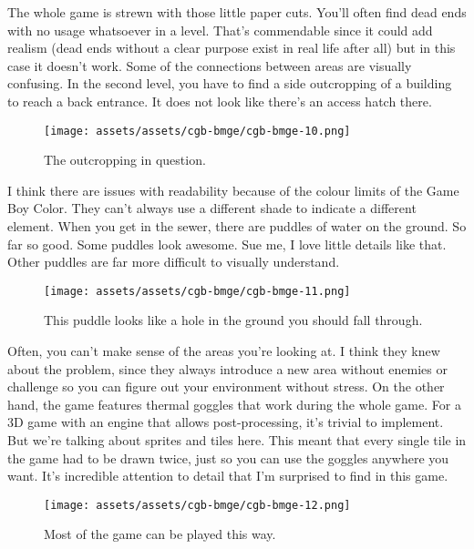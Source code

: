 \documentclass{book}
\begin{document}
The whole game is strewn with those little paper cuts. You’ll often find dead ends with no usage whatsoever in a level. That’s commendable since it could add realism (dead ends without a clear purpose exist in real life after all) but in this case it doesn’t work. Some of the connections between areas are visually confusing. In the second level, you have to find a side outcropping of a building to reach a back entrance. It does not look like there’s an access hatch there.

\begin{figure}[hbt]
\vskip 10pt
\centering \texttt{[image: assets/assets/cgb-bmge/cgb-bmge-10.png]}\par\pagetwodescription The outcropping in question.
\vskip 6pt
\end{figure}

I think there are issues with readability because of the colour limits of the Game Boy Color. They can’t always use a different shade to indicate a different element. When you get in the sewer, there are puddles of water on the ground. So far so good. Some puddles look awesome. Sue me, I love little details like that. Other puddles are far more difficult to visually understand.

\begin{figure}[hbt]
\vskip 10pt
\centering \texttt{[image: assets/assets/cgb-bmge/cgb-bmge-11.png]}\par\pagetwodescription This puddle looks like a hole in the ground you should fall through.
\vskip 6pt
\end{figure}

Often, you can’t make sense of the areas you’re looking at. I think they knew about the problem, since they always introduce a new area without enemies or challenge so you can figure out your environment without stress. On the other hand, the game features thermal goggles that work during the whole game. For a 3D game with an engine that allows post-processing, it’s trivial to implement. But we’re talking about sprites and tiles here. This meant that every single tile in the game had to be drawn twice, just so you can use the goggles anywhere you want. It’s incredible attention to detail that I’m surprised to find in this game.

\begin{figure}[hbt]
\vskip 10pt
\centering \texttt{[image: assets/assets/cgb-bmge/cgb-bmge-12.png]}\par\pagetwodescription Most of the game can be played this way.
\vskip 6pt
\end{figure}
\end{document}
